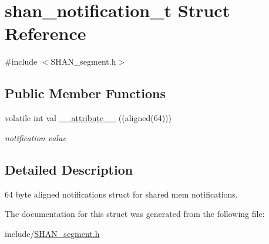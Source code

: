 \hypertarget{structshan__notification__t}{}\section{shan\+\_\+notification\+\_\+t Struct Reference}
\label{structshan__notification__t}


{\ttfamily \#include $<$S\+H\+A\+N\+\_\+segment.\+h$>$}

\subsection*{Public Member Functions}
\begin{DoxyCompactItemize}
\item 
volatile int val \hyperlink{structshan__notification__t_a19ff3d7ed20866127745591e3bdd7925}{\+\_\+\+\_\+attribute\+\_\+\+\_\+} ((aligned(64)))\hypertarget{structshan__notification__t_a19ff3d7ed20866127745591e3bdd7925}{}\label{structshan__notification__t_a19ff3d7ed20866127745591e3bdd7925}

\begin{DoxyCompactList}\small\item\em notification value \end{DoxyCompactList}\end{DoxyCompactItemize}


\subsection{Detailed Description}
64 byte aligned notifications struct for shared mem notifications. 

The documentation for this struct was generated from the following file\+:\begin{DoxyCompactItemize}
\item 
include/\hyperlink{SHAN__segment_8h}{S\+H\+A\+N\+\_\+segment.\+h}\end{DoxyCompactItemize}
